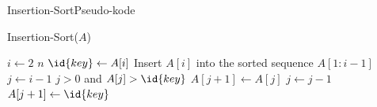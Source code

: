 \documentclass[aspectratio=1610]{beamer}
\begin{document}
\begin{frame}{Insertion-Sort}{Pseudo-kode}
    \centering
    \begin{minipage}{.8\textwidth}
        \begin{block}{Insertion-Sort($A$)}

        \vspace{-\abovedisplayskip}
            \begin{codebox}
                \li \For $i \gets 2$ \To $n$ \Do
                    \li $\id{key} \gets A[i]$
                    \li \Comment Insert $A[i]$ into the sorted sequence $A[1:i-1]$
                    \li $j \gets i - 1$
                    \li \While $j > 0$ and $A[j] > \id{key}$ \Do
                        \li $A[j+1] \gets A[j]$
                        \li $j \gets j - 1$
                    \End
                    \li $A[j+1] \gets \id{key}$
                \End
            \end{codebox}
        \end{block}
    \end{minipage}
    
\end{frame}
\end{document}
